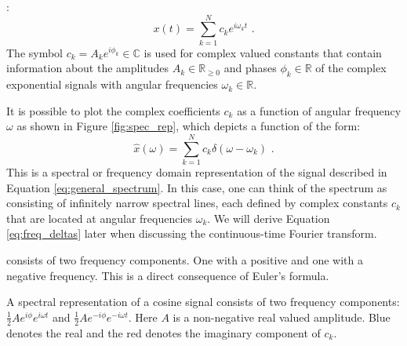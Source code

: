 :
\begin{equation}
x(t) = \sum_{k=1}^N c_k e^{i\omega_k t} \,\,.
\label{eq:general_spectrum}
\end{equation}
The symbol $c_k = A_k e^{i\phi_k} \in \mathbb{C}$ is used for complex valued constants that contain information about the 
amplitudes $A_k \in \mathbb{R}_{\ge 0}$ and phases $\phi_k \in \mathbb{R}$ of the complex exponential signals with angular frequencies $\omega_k \in \mathbb{R}$.

It is possible to plot the complex coefficients $c_k$ as a function of angular frequency $\omega$ as shown in Figure \ref{fig:spec_rep}, which depicts a function of the form:
\begin{equation}
\hat{x}(\omega) = \sum_{k=1}^N c_k \delta(\omega - \omega_k) \,\,.
\label{eq:freq_deltas}
\end{equation}
This is a spectral or frequency domain representation of the signal described in Equation \ref{eq:general_spectrum}. 
In this case, one can think of the spectrum as consisting of infinitely narrow spectral lines, each defined by complex constants $c_k$ that are located at angular frequencies $\omega_k$. 
We will derive Equation \ref{eq:freq_deltas} later when discussing the continuous-time Fourier transform.

 consists of two frequency components. One with a positive and one with a negative frequency. This is a direct consequence of Euler's formula. 

\begin{marginfigure}
\begin{center}
\end{center}
\caption{A spectral representation of a cosine signal consists of two frequency components: $\frac{1}{2}Ae^{i\phi}e^{i\omega t}$ and $\frac{1}{2}Ae^{-i\phi}e^{-i\omega t}$. Here $A$ is a non-negative real valued amplitude. Blue denotes the real and the red denotes the imaginary component of $c_k$.}
\label{fig:exspecsin}
\end{marginfigure}

